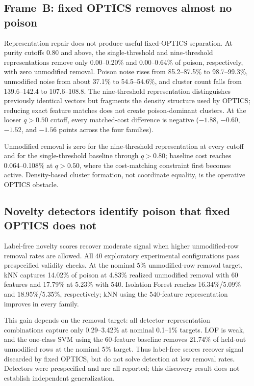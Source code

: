 \documentclass[conference]{IEEEtran}
\begin{document}
\subsection{Frame~B: fixed OPTICS removes almost no poison}
Representation repair does not produce useful fixed-OPTICS separation.
At purity cutoffs 0.80 and above, the single-threshold and nine-threshold
representations remove only 0.00--0.20\%
and 0.00--0.64\% of poison, respectively, with zero unmodified removal. Poison
noise rises from 85.2--87.5\% to 98.7--99.3\%, unmodified noise from about
37.1\% to 54.5--54.6\%, and cluster count falls from 139.6--142.4 to
107.6--108.8. The nine-threshold representation distinguishes previously
identical vectors but fragments the density structure used by OPTICS; reducing
exact feature matches does not create poison-dominant clusters. At the
looser $q>0.50$ cutoff, every matched-cost difference is negative
($-1.88$, $-0.60$, $-1.52$, and $-1.56$ points across the four families).

Unmodified removal is zero for the nine-threshold representation at every
cutoff and for the single-threshold baseline through $q>0.80$; baseline cost
reaches 0.064--0.108\% at $q>0.50$, where the cost-matching constraint first
becomes active. Density-based cluster formation, not coordinate equality, is
the operative OPTICS obstacle.

\subsection{Novelty detectors identify poison that fixed OPTICS does not}
Label-free novelty scores recover moderate signal when higher unmodified-row
removal rates are allowed.
All 40 exploratory experimental configurations pass prespecified validity
checks. At the nominal 5\% unmodified-row removal target,
kNN captures 14.02\% of poison at 4.83\% realized unmodified removal with 60
features and 17.79\% at 5.23\% with 540. Isolation Forest reaches
16.34\%/5.09\% and 18.95\%/5.35\%, respectively; kNN using the 540-feature
representation improves in every
family.

This gain depends on the removal target: all detector--representation
combinations capture only 0.29--3.42\% at nominal 0.1--1\% targets. LOF is
weak, and the one-class SVM using the 60-feature baseline removes 21.74\% of
held-out unmodified rows at the nominal 5\% target.
Thus label-free scores recover signal discarded by fixed OPTICS, but do not
solve detection at low removal rates. Detectors were prespecified and are all
reported; this discovery result does not establish independent generalization.
\end{document}
